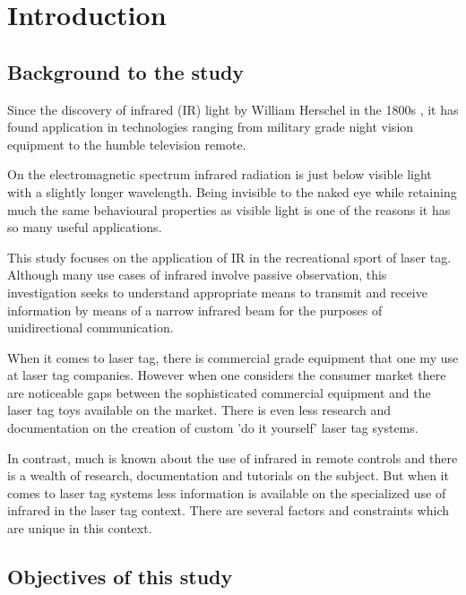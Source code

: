 \chapter{Introduction}
\label{ch_introduction}

\section{Background to the study}
Since the discovery of infrared (IR) light by William Herschel in the 1800s \cite{Rowan-Robinson2013}, it has found application in technologies ranging from military grade night vision equipment to the humble television remote.

On the electromagnetic spectrum infrared radiation is just below visible light with a slightly longer wavelength. Being invisible to the naked eye while retaining much the same behavioural properties as visible light is one of the reasons it has so many useful applications.

This study focuses on the application of IR in the recreational sport of laser tag. Although many use cases of infrared involve passive observation, this investigation seeks to understand appropriate means to transmit and receive information by means of a narrow infrared beam for the purposes of unidirectional communication.

When it comes to laser tag, there is commercial grade equipment that one my use at laser tag companies. However when one considers the consumer market there are noticeable gaps between the sophisticated commercial equipment and the laser tag toys available on the market. There is even less research and documentation on the creation of custom 'do it yourself' laser tag systems. 

In contrast, much is known about the use of infrared in remote controls and there is a wealth of research, documentation and tutorials on the subject. But when it comes to laser tag systems less information is available on the specialized use of infrared in the laser tag context. There are several factors and constraints which are unique in this context.



\section{Objectives of this study}
